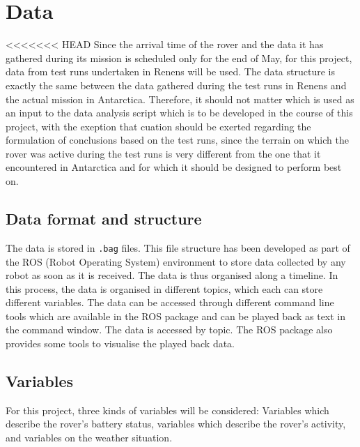 \documentclass[11pt, UKenglish]{report}
\begin{document}
{\begin{enumerate}
\end{enumerate}


\section*{Data}

<<<<<<< HEAD
Since the arrival time of the rover and the data it has gathered during its mission is scheduled only for the end of May, for this project, data from test runs undertaken in Renens will be used. The data structure is exactly the same between the data gathered during the test runs in Renens and the actual mission in Antarctica. Therefore, it should not matter which is used as an input to the data analysis script which is to be developed in the course of this project, with the exeption that cuation should be exerted regarding the formulation of conclusions based on the test runs, since the terrain on which the rover was active during the test runs is very different from the one that it encountered in Antarctica and for which it should be designed to perform best on. 

\subsection*{Data format and structure}

The data is stored in \texttt{.bag} files. This file structure has been developed as part of the ROS (Robot Operating System) environment to store data collected by any robot as soon as it is received. The data is thus organised along a timeline. In this process, the data is organised in different topics, which each can store different variables. The data can be accessed through different command line tools which are available in the ROS package and can be played back as text in the command window. The data is accessed by topic. The ROS package also provides some tools to visualise the played back data.

\subsection*{Variables}

For this project, three kinds of variables will be considered: Variables which describe the rover's battery status, variables which describe the rover's activity, and variables on the weather situation. 

}
\end{document}
